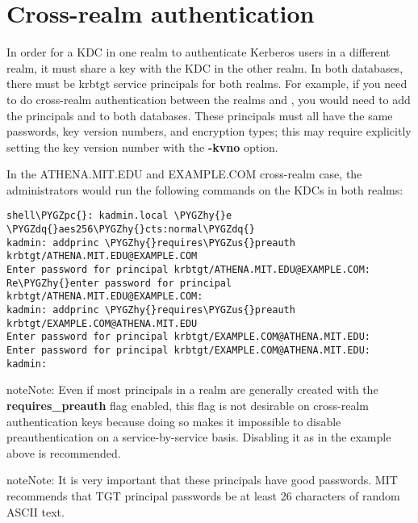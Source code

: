 \documentclass[letterpaper,10pt,english]{sphinxmanual}
\def\PYGZus{\char`\_}
\def\PYGZpc{\char`\%}
\def\PYGZhy{\char`\-}
\def\PYGZdq{\char`\"}
\begin{document}
\section{Cross-realm authentication}
\label{admin/database:cross-realm-authentication}\label{admin/database:xrealm-authn}
In order for a KDC in one realm to authenticate Kerberos users in a
different realm, it must share a key with the KDC in the other realm.
In both databases, there must be krbtgt service principals for both realms.
For example, if you need to do cross-realm authentication between the realms
 and , you would need to add the
principals  and
 to both databases.
These principals must all have the same passwords, key version
numbers, and encryption types; this may require explicitly setting
the key version number with the \textbf{-kvno} option.

In the ATHENA.MIT.EDU and EXAMPLE.COM cross-realm case, the administrators
would run the following commands on the KDCs in both realms:

\begin{Verbatim}[commandchars=\\\{\}]
shell\PYGZpc{}: kadmin.local \PYGZhy{}e \PYGZdq{}aes256\PYGZhy{}cts:normal\PYGZdq{}
kadmin: addprinc \PYGZhy{}requires\PYGZus{}preauth krbtgt/ATHENA.MIT.EDU@EXAMPLE.COM
Enter password for principal krbtgt/ATHENA.MIT.EDU@EXAMPLE.COM:
Re\PYGZhy{}enter password for principal krbtgt/ATHENA.MIT.EDU@EXAMPLE.COM:
kadmin: addprinc \PYGZhy{}requires\PYGZus{}preauth krbtgt/EXAMPLE.COM@ATHENA.MIT.EDU
Enter password for principal krbtgt/EXAMPLE.COM@ATHENA.MIT.EDU:
Enter password for principal krbtgt/EXAMPLE.COM@ATHENA.MIT.EDU:
kadmin:
\end{Verbatim}

\begin{notice}{note}{Note:}
Even if most principals in a realm are generally created
with the \textbf{requires\_preauth} flag enabled, this flag is not
desirable on cross-realm authentication keys because doing
so makes it impossible to disable preauthentication on a
service-by-service basis.  Disabling it as in the example
above is recommended.
\end{notice}

\begin{notice}{note}{Note:}
It is very important that these principals have good
passwords.  MIT recommends that TGT principal passwords be
at least 26 characters of random ASCII text.
\end{notice}
\end{document}
